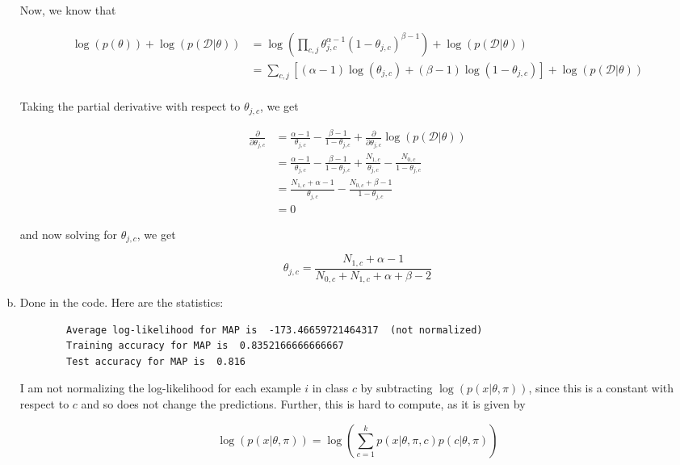 \documentclass{article}
\begin{document}
\begin{enumerate}[(a)]
    Now, we know that 

    \begin{align*}
        \log\left(p(\theta)\right) + \log \left(p(\mathcal{D} | \theta)\right) &= \log\left(
        \prod_{c, j} \theta_{j, c}^{\alpha - 1} (1 - \theta_{j, c})^{\beta - 1} \right)
        + \log \left(p(\mathcal{D} | \theta)\right) \\
        &= \sum_{c, j} \left[(\alpha - 1) \log(\theta_{j, c}) + (\beta - 1) \log(1 - \theta_{j, c})\right] + \log \left(p(\mathcal{D} | \theta)\right) \\
    \end{align*}

Taking the partial derivative with respect to $\theta_{j, c}$, we get

    \begin{align*}
        \frac{\partial}{\partial \theta_{j, c}} &= \frac{\alpha - 1}{\theta_{j, c}} - \frac{\beta - 1}{1 - \theta_{j, c}} + \frac{\partial}{\partial \theta_{j, c}} \log \left(p(\mathcal{D} | \theta)\right) \\
        &= \frac{\alpha - 1}{\theta_{j, c}} - \frac{\beta - 1}{1 - \theta_{j, c}} + \frac{N_{1, c}}{\theta_{j, c}} - \frac{N_{0, c}}{1 - \theta_{j, c}} \\
        &= \frac{N_{1, c} + \alpha - 1}{\theta_{j, c}} - \frac{N_{0, c} + \beta - 1}{1 - \theta_{j, c}} \\
        &= 0
    \end{align*}

    and now solving for $\theta_{j, c}$, we get

    \[\theta_{j, c} = \frac{N_{1, c} + \alpha - 1}{N_{0, c} + N_{1, c} + \alpha + \beta - 2}\]

    \item Done in the code. Here are the statistics:
    
    \begin{verbatim}
        Average log-likelihood for MAP is  -173.46659721464317  (not normalized)
        Training accuracy for MAP is  0.8352166666666667
        Test accuracy for MAP is  0.816
    \end{verbatim}

    I am not normalizing the log-likelihood for each example $i$ in class $c$ by subtracting $\log(p(x | \theta, \pi))$, since this is a constant with respect to $c$ and so does not change the predictions. Further, this is hard to compute, as it is given by 
    
    \[\log(p(x | \theta, \pi)) = \log\left(\sum_{c = 1}^k p(x | \theta, \pi, c) p(c | \theta, \pi)\right)\]


\end{enumerate}
\end{document}
